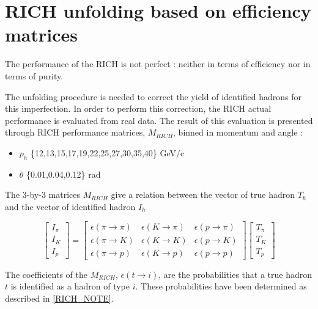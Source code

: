 
\section{RICH unfolding based on efficiency matrices}

The performance of the RICH is not perfect : neither in terms of efficiency nor in terms
of purity.

The unfolding procedure is needed to correct the yield of identified hadrons for this imperfection.
In order to perform this correction, the RICH actual performance is evaluated from real data. The result of
this evaluation is presented through RICH performance matrices, $M_{RICH}$, binned in momentum
and angle :

\begin{itemize}
  \item $p_h$ \{12,13,15,17,19,22,25,27,30,35,40\} GeV/c
  \item $\theta$ \{0.01,0.04,0.12\} rad
\end{itemize}

The 3-by-3 matrices $M_{RICH}$ give a relation between the vector of true hadron $T_h$ and the vector of
identified hadron $I_h$

\begin{equation}
\begin{bmatrix}
I_{\pi} \\
I_K \\
I_p
\end{bmatrix}
=
\begin{bmatrix}
\epsilon(\pi \rightarrow \pi) & \epsilon(K \rightarrow \pi) & \epsilon(p \rightarrow \pi)\\
\epsilon(\pi \rightarrow K) & \epsilon(K \rightarrow K) & \epsilon(p \rightarrow K) \\
\epsilon(\pi \rightarrow p) & \epsilon(K \rightarrow p) & \epsilon(p \rightarrow p)
\end{bmatrix}
\begin{bmatrix}
T_{\pi} \\
T_K \\
T_p
\end{bmatrix}
\end{equation}

The coefficients of the $M_{RICH}$, $\epsilon(t \rightarrow i)$, are the probabilities that a true hadron
$t$ is identified as a hadron of type $i$. These probabilities have been determined as described in \ref{RICH_NOTE}.

